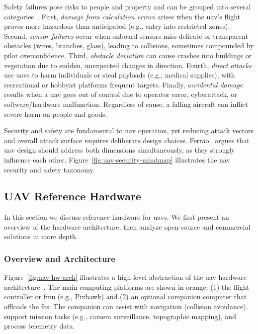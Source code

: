 Safety failures pose risks to people and property and can be grouped into
several categories~\cite{ferrao2020stuart}.
First, \emph{damage from calculation errors} arises when the \gls{uav}'s flight
proves more hazardous than anticipated (e.g., entry into restricted zones).
Second, \emph{sensor failures} occur when onboard sensors miss delicate or
transparent obstacles (wires, branches, glass), leading to collisions, sometimes
compounded by pilot overconfidence.
Third, \emph{obstacle deviation} can cause crashes into buildings or vegetation
due to sudden, unexpected changes in direction.
Fourth, \emph{direct attacks} use \glspl{uav} to harm individuals or steal
payloads (e.g., medical supplies), with recreational or hobbyist platforms
frequent targets.
Finally, \emph{accidental damage} results when a \gls{uav} goes out of control
due to operator error, cyberattack, or software/hardware malfunction.
Regardless of cause, a falling aircraft can inflict severe harm on people and
goods.

Security and safety are fundamental to \gls{uav} operation, yet reducing attack
vectors and overall attack surface requires deliberate design choices.
Ferrão~\cite{ferrao2020stuart} argues that \gls{uav} design should address both dimensions simultaneously, as they strongly influence each other. 
Figure~\ref{fig:uav-security-mindmap} illustrates the \gls{uav} security and safety taxonomy.

\subsection{UAV Reference Hardware}%
\label{sec:uav-ref-hw}
In this section we discuss reference hardware for \glspl{uav}. 
We first present an overview of the hardware architecture, then analyze open-source and commercial solutions in more depth.

\subsubsection{Overview and Architecture}%
\label{sec:overv-arch-hw}
Figure~\ref{fig:uav-hw-arch} illustrates a high-level abstraction of the \gls{uav} hardware architecture~\cite{leccadito2018survey,px4-sysArch}. 
The main computing platforms are shown in orange: (1) the flight controller or \gls{fmu} (e.g., Pixhawk) and (2) an optional companion computer that offloads the \gls{fcs}. 
The companion can assist with navigation (collision avoidance), support mission tasks (e.g., camera surveillance, topographic mapping), and process telemetry data.

